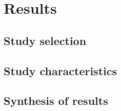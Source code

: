\section{Results}

\subsection{Study selection}


\subsection{Study characteristics}

\subsection{Synthesis of results}
